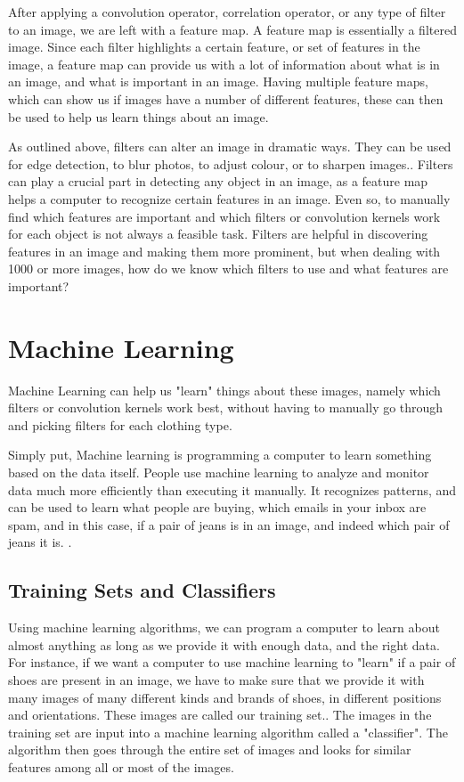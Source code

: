\documentclass[12pt]{report} %
\begin{document}
	 After applying a convolution operator, correlation operator, or any type of filter to an image, we are left with a feature map. A feature map is essentially a filtered image. Since each filter highlights a certain feature, or set of features in the image, a feature map can provide us with a lot of information about what is in an image, and what is important in an image\cite{aurelienMachineLearning}. Having multiple feature maps, which can show us if images have a number of different features, these can then be used to help us learn things about an image.
	
	As outlined above, filters can alter an image in dramatic ways. They can be used for edge detection, to blur photos, to adjust colour, or to sharpen images.\cite{szeliski2010computer}. Filters can play a crucial part in detecting any object in an image, as a feature map helps a computer to recognize certain features in an image. Even so, to manually find which features are important and which filters or convolution kernels work for each object is not always a feasible task. Filters are helpful in discovering features in an image and making them more prominent, but when dealing with 1000 or more images, how do we know which filters to use and what features are important? 
\chapter{Machine Learning}
	Machine Learning can help us "learn" things about these images, namely which filters or convolution kernels work best, without having to manually go through and picking filters for each clothing type. 
	
	Simply put, Machine learning is programming a computer to learn something based on the data itself. People use machine learning to analyze and monitor data much more efficiently than executing it manually. It recognizes patterns, and can be used to learn what people are buying, which emails in your inbox are spam, and in this case, if a pair of jeans is in an image, and indeed which pair of jeans it is. \cite{aurelienMachineLearning}. 

\section{Training Sets and Classifiers}
	Using machine learning algorithms, we can program a computer to learn about almost anything as long as we provide it with enough data, and the right data. For instance, if we want a computer to use machine learning to "learn" if a pair of shoes are present in an image, we have to make sure that we provide it with many images of many different kinds and brands of shoes, in different positions and orientations. These images are called our training set.\cite{aurelienMachineLearning}. The images in the training set are input into a machine learning algorithm called a "classifier"\cite{KubatMachineLearn}. The algorithm then goes through the entire set of images and looks for similar features among all or most of the images. 
	
\end{document}
